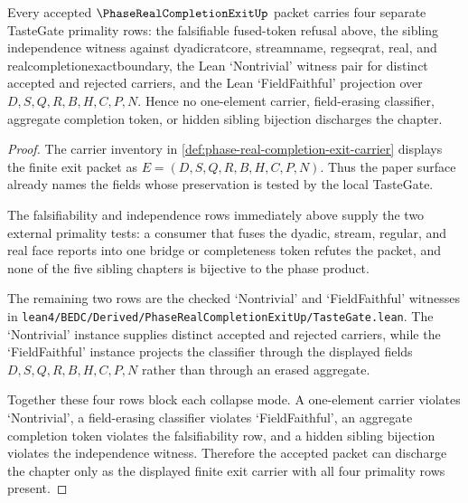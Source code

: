 
\begin{theorem}
\label{thm:phase-real-completion-exit-tastegate-primality-rows}
Every accepted $\PhaseRealCompletionExitUp$ packet carries four separate TasteGate primality rows: the falsifiable fused-token refusal above, the sibling independence witness against dyadicratcore, streamname, regseqrat, real, and realcompletionexactboundary, the Lean `Nontrivial' witness pair for distinct accepted and rejected carriers, and the Lean `FieldFaithful' projection over $D,S,Q,R,B,H,C,P,N$. Hence no one-element carrier, field-erasing classifier, aggregate completion token, or hidden sibling bijection discharges the chapter.
\end{theorem}
\begin{proof}
The carrier inventory in \autoref{def:phase-real-completion-exit-carrier} displays the finite exit packet as $E=(D,S,Q,R,B,H,C,P,N)$. Thus the paper surface already names the fields whose preservation is tested by the local TasteGate.

The falsifiability and independence rows immediately above supply the two external primality tests: a consumer that fuses the dyadic, stream, regular, and real face reports into one bridge or completeness token refutes the packet, and none of the five sibling chapters is bijective to the phase product.

The remaining two rows are the checked `Nontrivial' and `FieldFaithful' witnesses in \texttt{lean4/BEDC/Derived/PhaseRealCompletionExitUp/TasteGate.lean}. The `Nontrivial' instance supplies distinct accepted and rejected carriers, while the `FieldFaithful' instance projects the classifier through the displayed fields $D,S,Q,R,B,H,C,P,N$ rather than through an erased aggregate.

Together these four rows block each collapse mode. A one-element carrier violates `Nontrivial', a field-erasing classifier violates `FieldFaithful', an aggregate completion token violates the falsifiability row, and a hidden sibling bijection violates the independence witness. Therefore the accepted packet can discharge the chapter only as the displayed finite exit carrier with all four primality rows present.
\end{proof}

